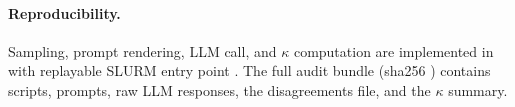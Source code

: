 \paragraph{Reproducibility.}
Sampling, prompt rendering, LLM call, and \(\kappa\) computation
are implemented in
with replayable SLURM entry point
. The full audit bundle
 (sha256
)
contains scripts, prompts, raw LLM responses, the disagreements
file, and the \(\kappa\) summary.